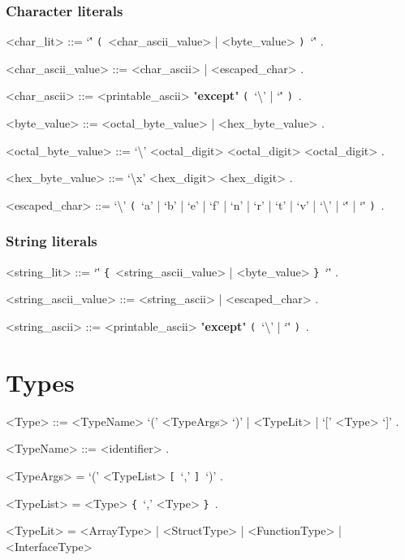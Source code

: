 \documentclass{article}
\def\lrep{\synshortsoff\texttt{\{}\synshorts~}
\def\rrep{\synshortsoff\texttt{\}}\synshorts~}
\def\lopt{\synshortsoff\texttt{[}\synshorts~}
\def\ropt{\synshortsoff\texttt{]}\synshorts~}
\def\lgrp{\synshortsoff\texttt{(}\synshorts~}
\def\rgrp{\synshortsoff\texttt{)}\synshorts~}
\begin{document}
\subsubsection*{Character literals}
\begin{grammar}
  <char_lit> ::= `\'' \lgrp <char_ascii_value> | <byte_value> \rgrp `\'' .

  <char_ascii_value> ::= <char_ascii> | <escaped_char> .

  <char_ascii> ::= <printable_ascii> "\textbf{except}" \lgrp `\textbackslash' | `\'' \rgrp .

  <byte_value> ::= <octal_byte_value> | <hex_byte_value> .

  <octal_byte_value> ::= `\textbackslash' <octal_digit> <octal_digit> <octal_digit> .

  <hex_byte_value> ::= `\textbackslash x' <hex_digit> <hex_digit> .

  <escaped_char> ::= `\textbackslash' \lgrp `a' | `b' | `e' | `f' | `n' | `r' | `t' | `v' | `\textbackslash' | `\'' | `\"' \rgrp .
\end{grammar}

\subsubsection*{String literals}
\begin{grammar}
  <string_lit> ::= `\"' \lrep <string_ascii_value> | <byte_value> \rrep `\"' .

  <string_ascii_value> ::= <string_ascii> | <escaped_char> .

  <string_ascii> ::= <printable_ascii> "\textbf{except}" \lgrp `\textbackslash' | `\"' \rgrp .
\end{grammar}




\section*{Types}
\begin{grammar}
	<Type> ::= <TypeName> `(' <TypeArgs> `)' | <TypeLit> | `[' <Type> `]' .

	<TypeName> ::= <identifier> . %

	<TypeArgs> = `(' <TypeList> \lopt `,' \ropt `)' .

	<TypeList> = <Type> \lrep `,' <Type> \rrep .

	<TypeLit> = <ArrayType> | <StructType> | <FunctionType> | <InterfaceType> %
\end{grammar}
\end{document}
